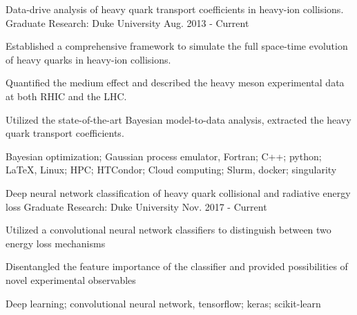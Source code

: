 

\begin{cventries}

 \rsexperience
    {Data-drive analysis of heavy quark transport coefficients in heavy-ion collisions.} %
    {Graduate Research: } %
    {Duke University} %
    {Aug. 2013 - Current} %
    {
      \begin{cvitems} %
      \item {Established a comprehensive framework to simulate the full space-time evolution of heavy quarks in heavy-ion collisions.}
      \item {Quantified the medium effect and described the heavy meson experimental data at both RHIC and the LHC.}
      \item {Utilized the state-of-the-art Bayesian model-to-data analysis, extracted the heavy quark transport coefficients.}
      \end{cvitems}
    }
    {Bayesian optimization; Gaussian process emulator, Fortran; C++; python; \LaTeX,  Linux; HPC; HTCondor; Cloud computing; Slurm, docker; singularity}
        
    
  \rsexperience
    {Deep neural network classification of heavy quark collisional and radiative energy loss} %
    {Graduate Research: } %
    {Duke University} %
    {Nov. 2017 - Current} %
    {
      \begin{cvitems} %
      \item {Utilized a convolutional neural network classifiers to distinguish between two energy loss mechanisms}
      \item {Disentangled the feature importance of the classifier and provided possibilities of novel experimental observables}
      \end{cvitems}
    }
	{Deep learning; convolutional neural network, tensorflow; keras; scikit-learn}
	

\end{cventries}
